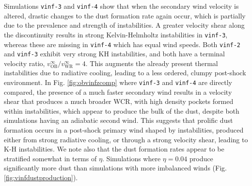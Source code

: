 Simulations \texttt{vinf-3} and \texttt{vinf-4} show that when the secondary wind velocity is altered, drastic changes to the dust formation rate again occur, which is partially due to the prevalence and strength of instabilities.
A greater velocity shear along the discontinuity results in strong Kelvin-Helmholtz instabilities in \texttt{vinf-3}, whereas these are missing in \texttt{vinf-4} which has equal wind speeds.
Both \texttt{vinf-2} and \texttt{vinf-3} exhibit very strong KH instabilities, and both have a terminal velocity ratio, $v_\text{OB}^\infty / v_\text{WR}^\infty = 4$.
This augments the already present thermal instabilities due to radiative cooling, leading to a less ordered, clumpy post-shock environment.
In Fig. \ref{fig:obvinfzcomp} where \texttt{vinf-3} and \texttt{vinf-4} are directly compared, the presence of a much faster secondary wind results in a velocity shear that produces a much broader WCR, with high density pockets formed within instabilities, which appear to produce the bulk of the dust, despite both simulations having an adiabatic second wind. 
This suggests that prolific dust formation occurs in a post-shock primary wind shaped by instabilities, produced either from strong radiative cooling, or through a strong velocity shear, leading to K-H instabilities.
We note also that the dust formation rates appear to be stratified somewhat in terms of $\eta$.
Simulations where $\eta = 0.04$ produce significantly more dust than simulations with more imbalanced winds (Fig. \ref{fig:vinfdustproduction}).


